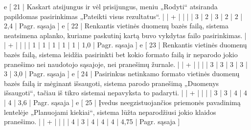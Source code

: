 {%
  e [ 21 | Kaskart atsijungus ir vėl prisijungus, meniu „Rodyti“ atsiranda papildomas
  pasirinkimas „Pateikti visus rezultatus“.
                    |   | + |   |   |   | 3 | 2 | 3 | 2 | 2 | 2,4  | Pagr. sąsaja ]
  e [ 22 | Renkantis vietinės duomenų bazės failą, sistema neatsimena aplanko,
  kuriame paskutinį kartą buvo vykdytas failo pasirinkimas.
                    |   | + |   |   |   | 1 | 1 | 1 | 1 | 1 | 1,0  | Pagr. sąsaja ]
  e [ 23 | Renkantis vietinės duomenų bazės failą, sistema leidžia pasirinkti
  bet kokio formato failą ir neparodo jokio pranešimo nei naudotojo sąsajoje,
  nei pranešimų žurnale.
                    |   | + |   |   |   | 3 | 3 | 3 | 3 | 3 | 3,0  | Pagr. sąsaja ]
  e [ 24 | Pasirinkus netinkamo formato vietinės duomenų bazės failą ir mėginant
  išsaugoti, sistema parodo pranešimą „Duomenys išsaugoti“, tačiau iš tikro sistemai
  nepavyksta to padaryti.
                    |   | + |   |   |   | 3 | 3 | 4 | 4 | 4 | 3,6  | Pagr. sąsaja ]
  e [ 25 | Įvedus neegzistuojančios priemonės pavadinimą lentelėje „Planuojami kiekiai“,
  sistema lūžta neparodžiusi jokio klaidos pranešimo.
                    |   | + |   |   |   | 4 | 3 | 4 | 4 | 4 | 4,75 | Pagr. sąsaja ]
}
